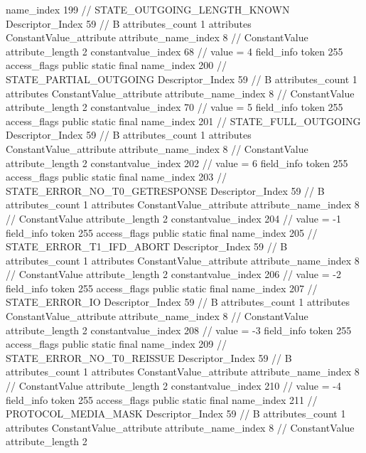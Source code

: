 {{{{{				name_index	199		// STATE_OUTGOING_LENGTH_KNOWN
				Descriptor_Index	59		// B
				attributes_count	1
				attributes {
				ConstantValue_attribute {
					attribute_name_index	8		// ConstantValue
					attribute_length	2
					constantvalue_index	68		// value = 4
				}
				}
			}
			field_info {
				token	255
				access_flags	public static final
				name_index	200		// STATE_PARTIAL_OUTGOING
				Descriptor_Index	59		// B
				attributes_count	1
				attributes {
				ConstantValue_attribute {
					attribute_name_index	8		// ConstantValue
					attribute_length	2
					constantvalue_index	70		// value = 5
				}
				}
			}
			field_info {
				token	255
				access_flags	public static final
				name_index	201		// STATE_FULL_OUTGOING
				Descriptor_Index	59		// B
				attributes_count	1
				attributes {
				ConstantValue_attribute {
					attribute_name_index	8		// ConstantValue
					attribute_length	2
					constantvalue_index	202		// value = 6
				}
				}
			}
			field_info {
				token	255
				access_flags	public static final
				name_index	203		// STATE_ERROR_NO_T0_GETRESPONSE
				Descriptor_Index	59		// B
				attributes_count	1
				attributes {
				ConstantValue_attribute {
					attribute_name_index	8		// ConstantValue
					attribute_length	2
					constantvalue_index	204		// value = -1
				}
				}
			}
			field_info {
				token	255
				access_flags	public static final
				name_index	205		// STATE_ERROR_T1_IFD_ABORT
				Descriptor_Index	59		// B
				attributes_count	1
				attributes {
				ConstantValue_attribute {
					attribute_name_index	8		// ConstantValue
					attribute_length	2
					constantvalue_index	206		// value = -2
				}
				}
			}
			field_info {
				token	255
				access_flags	public static final
				name_index	207		// STATE_ERROR_IO
				Descriptor_Index	59		// B
				attributes_count	1
				attributes {
				ConstantValue_attribute {
					attribute_name_index	8		// ConstantValue
					attribute_length	2
					constantvalue_index	208		// value = -3
				}
				}
			}
			field_info {
				token	255
				access_flags	public static final
				name_index	209		// STATE_ERROR_NO_T0_REISSUE
				Descriptor_Index	59		// B
				attributes_count	1
				attributes {
				ConstantValue_attribute {
					attribute_name_index	8		// ConstantValue
					attribute_length	2
					constantvalue_index	210		// value = -4
				}
				}
			}
			field_info {
				token	255
				access_flags	public static final
				name_index	211		// PROTOCOL_MEDIA_MASK
				Descriptor_Index	59		// B
				attributes_count	1
				attributes {
				ConstantValue_attribute {
					attribute_name_index	8		// ConstantValue
					attribute_length	2
}}}}}}}
